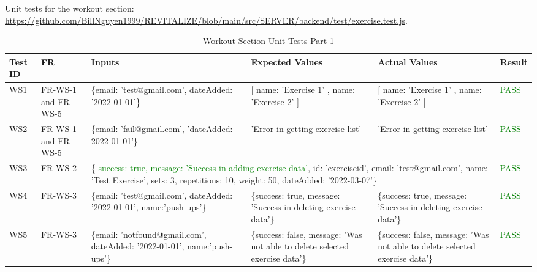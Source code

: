 \documentclass[12pt, titlepage]{article}
\begin{document}
Unit tests for the workout section: \url{https://github.com/BillNguyen1999/REVITALIZE/blob/main/src/SERVER/backend/test/exercise.test.js}.
\begin{table}[h]
    \centering
    \small
    \begin{tabularx}{\textwidth}{|X|X|p{3cm}|p{2.5cm}|p{2.5cm}|X|}
        \hline
        Test ID & FR & Inputs & Expected Values & Actual Values & Result \\
        \hline
        WS1 & FR-WS-1 and FR-WS-5 & \{email: 'test@gmail.com', dateAdded: '2022-01-01'\}  & [{ name: 'Exercise 1' }, { name: 'Exercise 2' }] & [{ name: 'Exercise 1' }, { name: 'Exercise 2' }] & \textcolor{Green}{PASS} \\
        \hline
        WS2 & FR-WS-1 and FR-WS-5 & \{email: 'fail@gmail.com', 'dateAdded: 2022-01-01'\}  & 'Error in getting exercise list' & 'Error in getting exercise list' & \textcolor{Green}{PASS} \\
        \hline
        WS3 & FR-WS-2 & \multicolumn{3}{p{8cm}|}{\centering \{ \textcolor{Green}{success: true, message: 'Success in adding exercise data'}, id: 'exerciseid', email: 'test@gmail.com', name: 'Test Exercise', sets: 3, repetitions: 10, weight: 50, dateAdded: '2022-03-07'\}}  &  \textcolor{Green}{PASS}\\
        \hline
        WS4 & FR-WS-3 & \{email: 'test@gmail.com', dateAdded: '2022-01-01', name:'push-ups'\}  & \{success: true, message: 'Success in deleting exercise data'\} & \{success: true, message: 'Success in deleting exercise data'\} & \textcolor{Green}{PASS} \\
        \hline
        WS5 & FR-WS-3 & \{email: 'notfound@gmail.com', dateAdded: '2022-01-01', name:'push-ups'\}  & \{success: false, message: 'Was not able to delete selected exercise data'\} & \{success: false, message: 'Was not able to delete selected exercise data'\} & \textcolor{Green}{PASS} \\
        \hline
    \end{tabularx}
    \caption{Workout Section Unit Tests Part 1}
    \label{table:workout-unit-tests}
\end{table}

\newpage
\end{document}
